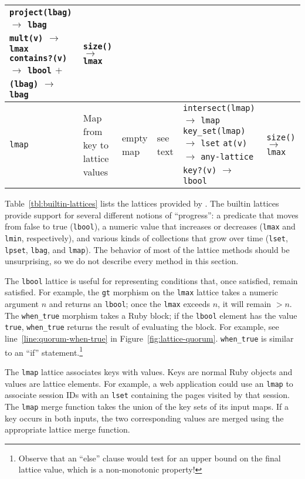 \begin{table*}[t]
\begin{center}
\begin{tabular}{|l|l|l|l|p{1.57in}|p{1.09in}|}
\texttt{project(lbag)} $\to$ \texttt{lbag}\newline
\texttt{mult(v)} $\to$ \texttt{lmax}\newline
\texttt{contains?(v)} $\to$ \texttt{lbool}\newline
\texttt{$\mathtt{+}$(lbag)} $\to$ \texttt{lbag}
& \texttt{size()} $\to$ \texttt{lmax}\\
\hline
\texttt{lmap} & Map from key to lattice values & empty map & see text&
\texttt{intersect(lmap)} $\to$ \texttt{lmap}\newline
\texttt{key\_set(lmap)} $\to$ \texttt{lset}\newline
\texttt{at(v)} $\to$ \texttt{any-lattice}\newline
\texttt{key?(v)} $\to$ \texttt{lbool}
& \texttt{size()} $\to$ \texttt{lmax}\\
\hline
\end{tabular}
\caption{Builtin lattices in \lang. \texttt{v} denotes a Ruby value and
  \texttt{n} denotes a number.}
\label{tbl:builtin-lattices}
\end{center}
\end{table*}


Table~\ref{tbl:builtin-lattices} lists the lattices provided by \lang. The
builtin lattices provide support for several different notions of ``progress'':
a predicate that moves from false to true (\texttt{lbool}), a numeric value that
increases or decreases (\texttt{lmax} and \texttt{lmin}, respectively), and
various kinds of collections that grow over time (\texttt{lset}, \texttt{lpset},
\texttt{lbag}, and \texttt{lmap}). The behavior of most of the lattice methods
should be unsurprising, so we do not describe every method in this section.

The \texttt{lbool} lattice is useful for representing conditions that, once
satisfied, remain satisfied. For example, the \texttt{gt} morphism on the
\texttt{lmax} lattice takes a numeric argument $n$ and returns an
\texttt{lbool}; once the \texttt{lmax} exceeds $n$, it will remain $>n$. The
\texttt{when\_true} morphism takes a Ruby block; if the \texttt{lbool} element
has the value \texttt{true}, \texttt{when\_true} returns the result of
evaluating the block. For example, see line~\ref{line:quorum-when-true} in
Figure~\ref{fig:lattice-quorum}. \texttt{when\_true} is similar to an ``if''
statement.\footnote{Observe that an ``else'' clause would test for an upper bound on the final lattice value, which is a non-monotonic property!}

The \texttt{lmap} lattice associates keys with values. Keys are normal Ruby
objects and values are lattice elements. For example, a web application could
use an \texttt{lmap} to associate session IDs with an \texttt{lset} containing
the pages visited by that session. The \texttt{lmap} merge function takes the
union of the key sets of its input maps. If a key occurs in both inputs, the two
corresponding values are merged using the appropriate lattice merge function.

